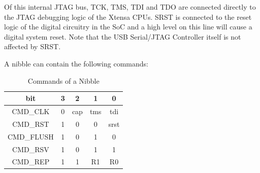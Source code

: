 \documentclass[main\_\_EN.tex]{subfiles}
\begin{document}
Of this internal JTAG bus, TCK, TMS, TDI and TDO are connected directly to the JTAG debugging logic of the Xtensa CPUs. SRST is connected to the reset logic of the digital circuitry in the SoC and a high level on this line will cause a digital system reset. Note that the USB Serial/JTAG Controller itself is not affected by SRST.

A nibble can contain the following commands:


\begin{table}[H]
    \centering
    \caption{Commands of a Nibble}
    \label{tab:usbserialjtag-commands-of-a-nibble}

    \begin{tabular}{|c|c c c c|}
    \hline
        \rowcolor{lightgray}
        \textbf{bit} & \textbf{3} & \textbf{2} & \textbf{1} & \textbf{0}
        \\\hline

        CMD\_CLK & 0 &  cap & tms & tdi \\\hline
        CMD\_RST & 1 & 0 & 0 & srst \\\hline
        CMD\_FLUSH & 1 & 0 & 1 & 0 \\\hline
        CMD\_RSV & 1 & 0 & 1 & 1 \\\hline
        CMD\_REP & 1 & 1 & R1 & R0 \\\hline
    \end{tabular}
\end{table}
\end{document}
